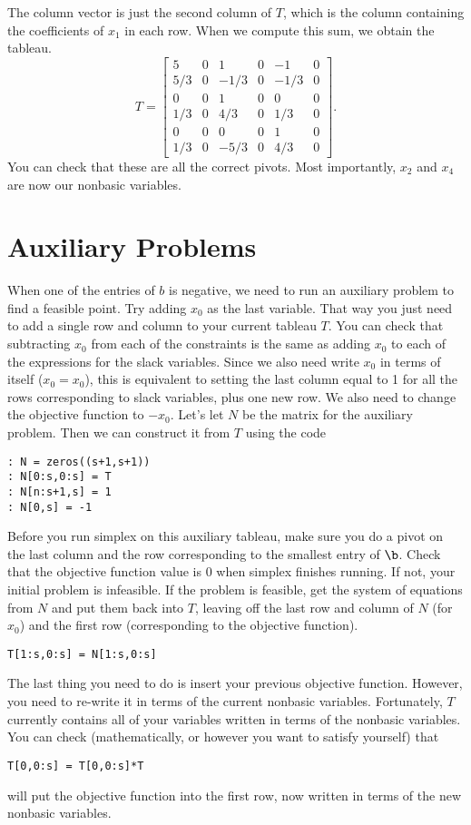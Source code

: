 The column vector is just the second column of $T$, which is the column containing the coefficients of $x_1$ in each row. When we compute this sum, we obtain the tableau.
\[
	T = \begin{bmatrix}
		5 &  0 & 1 & 0 & -1 & 0 \\
		5/3 & 0 &-1/3 & 0 &-1/3 & 0 \\
		0 & 0 & 1 & 0 & 0 & 0 \\
		1/3 & 0 & 4/3 & 0 & 1/3 & 0 \\
		0 & 0 & 0 & 0 & 1 & 0 \\
		1/3 & 0 & -5/3 & 0 & 4/3 & 0
	\end{bmatrix}.
\]
You can check that these are all the correct pivots. Most importantly, $x_2$ and $x_4$ are now our nonbasic variables.

\section{Auxiliary Problems}

When one of the entries of $b$ is negative, we need to run an auxiliary problem to find a feasible point. Try adding $x_0$ as the last variable. That way you just need to add a single row and column to your current tableau $T$. You can check that subtracting $x_0$ from each of the constraints is the same as adding $x_0$ to each of the expressions for the slack variables. Since we also need write $x_0$ in terms of itself ($x_0 = x_0$), this is equivalent to setting the last column equal to 1 for all the rows corresponding to slack variables, plus one new row. We also need to change the objective function to $-x_0$. Let's let $N$ be the matrix for the auxiliary problem. Then we can construct it from $T$ using the code 
\begin{lstlisting}[style=python]
: N = zeros((s+1,s+1))
: N[0:s,0:s] = T
: N[n:s+1,s] = 1
: N[0,s] = -1
\end{lstlisting}

Before you run simplex on this auxiliary tableau, make sure you do a pivot on the last column and the row corresponding to the smallest entry of $\b$. Check that the objective function value is 0 when simplex finishes running. If not, your initial problem is infeasible. If the problem is feasible, get the system of equations from $N$ and put them back into $T$, leaving off the last row and column of $N$ (for $x_0$) and the first row (corresponding to the objective function).
\begin{lstlisting}[style=python]
T[1:s,0:s] = N[1:s,0:s]
\end{lstlisting}
The last thing you need to do is insert your previous objective function. However, you need to re-write it in terms of the current nonbasic variables. Fortunately, $T$ currently contains all of your variables written in terms of the nonbasic variables. You can check (mathematically, or however you want to satisfy yourself) that
\begin{lstlisting}[style=python]
T[0,0:s] = T[0,0:s]*T
\end{lstlisting}
will put the objective function into the first row, now written in terms of the new nonbasic variables.

